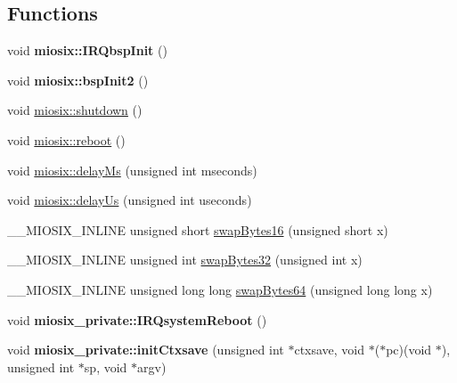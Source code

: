 \subsection*{Functions}
\begin{DoxyCompactItemize}
\item 
\hypertarget{group___interfaces_gaeb88457f0a1ad58c9dd7e7bef0783428}{void {\bfseries miosix\-::\-I\-R\-Qbsp\-Init} ()}\label{group___interfaces_gaeb88457f0a1ad58c9dd7e7bef0783428}

\item 
\hypertarget{group___interfaces_gab7a59706596b512a2349a9539c9520d8}{void {\bfseries miosix\-::bsp\-Init2} ()}\label{group___interfaces_gab7a59706596b512a2349a9539c9520d8}

\item 
void \hyperlink{group___interfaces_gae0495cbfc806a0db0cdf2ff023945516}{miosix\-::shutdown} ()
\item 
void \hyperlink{group___interfaces_ga6f70fdbc3b5d6afa41b5dbc5272cc6a0}{miosix\-::reboot} ()
\item 
void \hyperlink{group___interfaces_ga9d13aceddc0481fd1077e6fdfb31f9a7}{miosix\-::delay\-Ms} (unsigned int mseconds)
\item 
void \hyperlink{group___interfaces_ga244f9474d20ffd5d905855f68aa3114f}{miosix\-::delay\-Us} (unsigned int useconds)
\item 
\-\_\-\-\_\-\-M\-I\-O\-S\-I\-X\-\_\-\-I\-N\-L\-I\-N\-E unsigned short \hyperlink{group___interfaces_gae568ebe5457b535d78e34cc75ce3c4c1}{swap\-Bytes16} (unsigned short x)
\item 
\-\_\-\-\_\-\-M\-I\-O\-S\-I\-X\-\_\-\-I\-N\-L\-I\-N\-E unsigned int \hyperlink{group___interfaces_ga8941def52689721dbc86c70153d90864}{swap\-Bytes32} (unsigned int x)
\item 
\-\_\-\-\_\-\-M\-I\-O\-S\-I\-X\-\_\-\-I\-N\-L\-I\-N\-E unsigned long long \hyperlink{group___interfaces_ga173fe4adab327c9401b6c95b871bc1d1}{swap\-Bytes64} (unsigned long long x)
\item 
\hypertarget{group___interfaces_gac4d0a63745010331da4c5e9275665ccd}{void {\bfseries miosix\-\_\-private\-::\-I\-R\-Qsystem\-Reboot} ()}\label{group___interfaces_gac4d0a63745010331da4c5e9275665ccd}

\item 
\hypertarget{group___interfaces_gad6e1b120330ae5e0c580061c1f83cde1}{void {\bfseries miosix\-\_\-private\-::init\-Ctxsave} (unsigned int $\ast$ctxsave, void $\ast$($\ast$pc)(void $\ast$), unsigned int $\ast$sp, void $\ast$argv)}\label{group___interfaces_gad6e1b120330ae5e0c580061c1f83cde1}


\end{DoxyCompactItemize}
